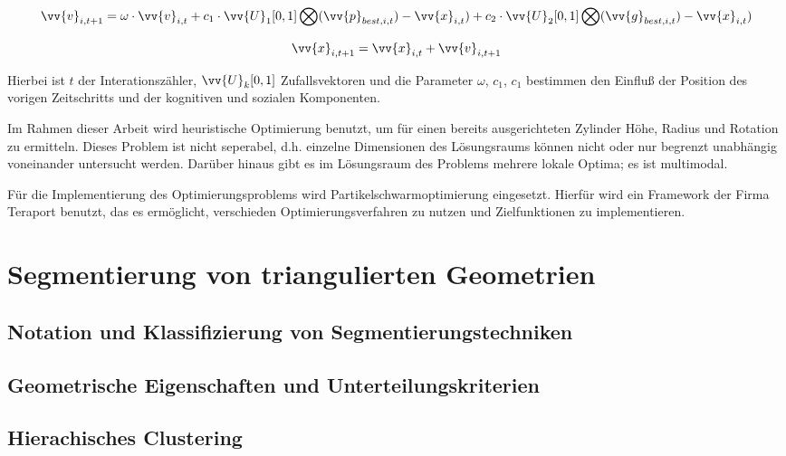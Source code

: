 \begin{equation}
\vv{v}_{i,t+1} = \omega\cdot\vv{v}_{i,t}+c_{1}\cdot\vv{U}_{1}[0,1]\bigotimes(\vv{p}_{best,i,t})-\vv{x}_{i,t})
+c_{2}\cdot\vv{U}_{2}[0,1]\bigotimes(\vv{g}_{best,i,t})-\vv{x}_{i,t})
\end{equation}

\begin{equation}
\vv{x}_{i,t+1} = \vv{x}_{i,t} + \vv{v}_{i,t+1}
\end{equation}

Hierbei ist $t$ der Interationsz\"ahler, $\vv{U}_{k}[0,1]$ Zufallsvektoren und die Parameter $\omega$, $c_{1}$, $c_{1}$ bestimmen den Einflu{\ss}  der Position des vorigen Zeitschritts und der kognitiven und sozialen Komponenten.

Im Rahmen dieser Arbeit wird heuristische Optimierung benutzt, um f\"ur einen bereits ausgerichteten Zylinder H\"ohe, Radius und Rotation zu ermitteln. Dieses Problem ist nicht seperabel, d.h. einzelne Dimensionen des L\"osungsraums k\"onnen nicht oder nur begrenzt unabh\"angig voneinander untersucht werden. Dar\"uber hinaus gibt es im L\"osungsraum des Problems mehrere lokale Optima; es ist multimodal.

F\"ur die Implementierung des Optimierungsproblems wird Partikelschwarmoptimierung eingesetzt. Hierf\"ur wird ein Framework der Firma Teraport benutzt, das es erm\"oglicht, verschieden Optimierungsverfahren zu nutzen und Zielfunktionen zu implementieren.

\section{Segmentierung von triangulierten Geometrien}
\subsection{Notation und Klassifizierung von Segmentierungstechniken}
\subsection{Geometrische Eigenschaften und Unterteilungskriterien}
\subsection{Hierachisches Clustering}

